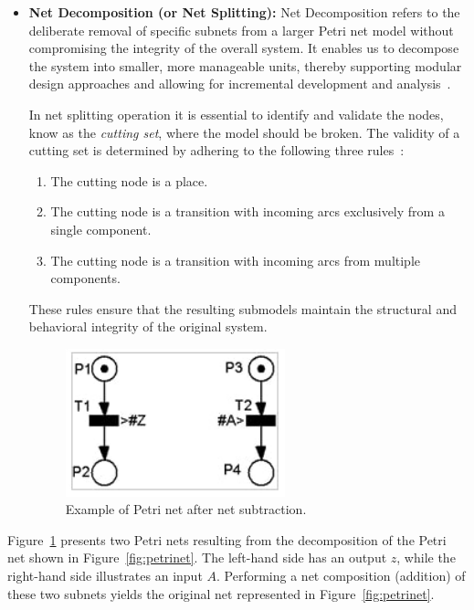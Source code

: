 \begin{itemize}
    \item \textbf{Net Decomposition (or Net Splitting): }     
Net Decomposition refers to the deliberate removal of specific subnets from a larger Petri net model without compromising the integrity of the overall system. It enables us to decompose the system into smaller, more manageable units, thereby supporting modular design approaches and  allowing for incremental development and analysis~\cite{Barrosadd}. 


In net splitting operation it is essential to identify and validate the nodes, know as the \emph{cutting set}, where the model should be broken. The validity of a cutting set is determined by adhering to the following three rules~\cite{apresentacao}:

\begin{enumerate}
    \item The cutting node is a place.
    \item The cutting node is a transition with incoming arcs exclusively from a single component.
    \item The cutting node is a transition with incoming arcs from multiple components.
\end{enumerate}

These rules ensure that the resulting submodels maintain the structural and behavioral integrity of the original system.



\begin{figure}[htbp]
  \centering
  \includegraphics[width=0.6\textwidth]{Chapters/Figures/petrisplit.jpg}
  \caption{Example of Petri net after net subtraction.}
  \label{fig:petrisplit}
\end{figure}


\end{itemize}


Figure~\ref{fig:petrisplit} presents two Petri nets resulting from the decomposition of the Petri net shown in Figure~\ref{fig:petrinet}. The left-hand side has an output \( z \), while the right-hand side illustrates an input \( A \). Performing a net composition (addition) of these two subnets yields the original net represented in Figure~\ref{fig:petrinet}.


